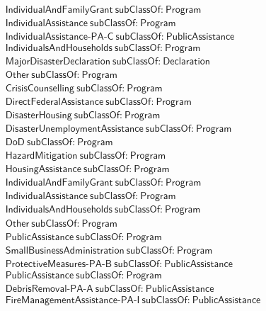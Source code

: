 \begin{align}
  \textsf{IndividualAndFamilyGrant}~\textsf{subClassOf:}~\textsf{Program}\\
  \textsf{IndividualAssistance}~\textsf{subClassOf:}~\textsf{Program}\\
  \textsf{IndividualAssistance-PA-C}~\textsf{subClassOf:}~\textsf{PublicAssistance}\\
  \textsf{IndividualsAndHouseholds}~\textsf{subClassOf:}~\textsf{Program}\\
  \textsf{MajorDisasterDeclaration}~\textsf{subClassOf:}~\textsf{Declaration}\\
  \textsf{Other}~\textsf{subClassOf:}~\textsf{Program}\\
  \textsf{CrisisCounselling}~\textsf{subClassOf:}~\textsf{Program}\\
  \textsf{DirectFederalAssistance}~\textsf{subClassOf:}~\textsf{Program}\\
  \textsf{DisasterHousing}~\textsf{subClassOf:}~\textsf{Program}\\
  \textsf{DisasterUnemploymentAssistance}~\textsf{subClassOf:}~\textsf{Program}\\
  \textsf{DoD}~\textsf{subClassOf:}~\textsf{Program}\\
  \textsf{HazardMitigation}~\textsf{subClassOf:}~\textsf{Program}\\
  \textsf{HousingAssistance}~\textsf{subClassOf:}~\textsf{Program}\\
  \textsf{IndividualAndFamilyGrant}~\textsf{subClassOf:}~\textsf{Program}\\
  \textsf{IndividualAssistance}~\textsf{subClassOf:}~\textsf{Program}\\
  \textsf{IndividualsAndHouseholds}~\textsf{subClassOf:}~\textsf{Program}\\
  \textsf{Other}~\textsf{subClassOf:}~\textsf{Program}\\
  \textsf{PublicAssistance}~\textsf{subClassOf:}~\textsf{Program}\\
  \textsf{SmallBusinessAdministration}~\textsf{subClassOf:}~\textsf{Program}\\
  \textsf{ProtectiveMeasures-PA-B}~\textsf{subClassOf:}~\textsf{PublicAssistance}\\
  \textsf{PublicAssistance}~\textsf{subClassOf:}~\textsf{Program}\\
  \textsf{DebrisRemoval-PA-A}~\textsf{subClassOf:}~\textsf{PublicAssistance}\\
  \textsf{FireManagementAssistance-PA-I}~\textsf{subClassOf:}~\textsf{PublicAssistance}\\

\end{align}
